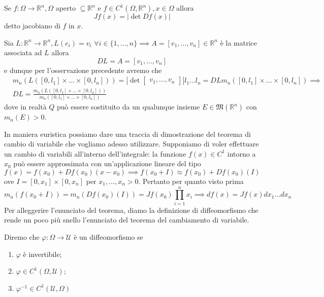 \begin{definition}[jacobiano]
	Se $f: \Omega \to \mathbb{R}^n, \Omega$ aperto $\subseteq \mathbb{R}^n$ e $f \in C^1(\Omega, \mathbb{R}^n), x \in \Omega$ allora
	$$
	Jf(x) = |\det{Df(x)}|
	$$
	detto jacobiano di $f$ in $x$.
\end{definition}
\begin{remark}
	Sia $L: \mathbb{R}^n \to \mathbb{R}^n, L(e_i) = v_i \, \, \forall i \in \{1, \ldots, n \} \implies A = [v_1, \ldots, v_n] \in \mathbb{R}^n$ è la matrice associata ad $L$ allora
	$$
	DL = A = [v_1, \ldots, v_n]
	$$
	e dunque per l'osservazione precedente avremo che
	\begin{align*}
	&m_n (L([0, l_1] \times \ldots \times [0, l_n])) = \left| \det \begin{bmatrix} v_1, \ldots, v_n \end{bmatrix} \right| l_1 \ldots l_n = DL m_n([0, l_1] \times \ldots \times [0, l_n]) \implies \\ 
	&DL = \frac{m_n(L([0, l_1] \times \ldots \times [0, l_n]))}{m_n([0, l_1] \times \ldots \times [0, l_n])}
	\end{align*}
	dove in realtà $Q$ può essere sostituito da un qualunque insieme $E \in \mathfrak{M}(\mathbb{R}^n)$ con $m_n(E) > 0$.
\end{remark}
In maniera euristica possiamo dare una traccia di dimostrazione del teorema di cambio di variabile che vogliamo adesso utilizzare. Supponiamo di voler effettuare un cambio di variabili all'interno dell'integrale: la funzione $f(x) \in C^1$ intorno a $x_0$ può
essere approssimata con un'applicazione lineare del tipo
$$
f(x) = f(x_0) + Df(x_0)(x-x_0) \implies f(x_0 + I) \approx f(x_0) + Df(x_0)(I)
$$
ove $I=[0, x_1] \times [0, x_n]$ per $x_1, \ldots, x_n > 0$. Pertanto per quanto visto prima
$$
m_n(f(x_0 + I)) = m_n(Df(x_0)(I)) = Jf(x_0) \prod_{i=1}^n x_i \implies df(x) = Jf(x) dx_1 \ldots dx_n
$$
Per alleggerire l'enunciato del teorema, diamo la definizione di diffeomorfismo che rende un poco più snello l'enunciato del teorema del cambiamento di variabile.
\begin{definition}[diffeomorfismo]
	Diremo che $\varphi: \Omega \to \mathcal{U}$ è un diffeomorfismo se 
	\begin{enumerate}[label=\protect\circled{\arabic*}]
		\item $\varphi$ è invertibile; 
		\item $\varphi \in C^1(\Omega, \mathcal{U})$;
		\item $\varphi^{-1} \in C^1(\mathcal{U}, \Omega)$
	\end{enumerate}
\end{definition}
